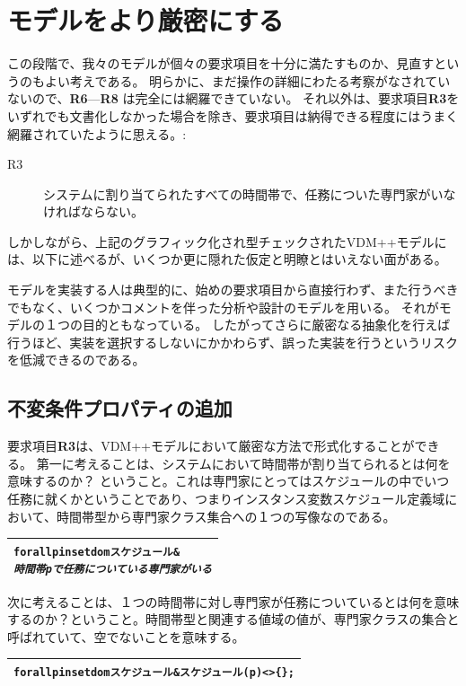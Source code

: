 \documentclass[\pformat,12pt,twoside]{jarticle}
\newenvironment{VDMgray}%
{\begin{tabular}{|G|}\hline\small\begin{alltt}}%
{\end{alltt}\normalsize\\
 \hline\end{tabular}}
\begin{document}
\section{モデルをより厳密にする}

この段階で、我々のモデルが個々の要求項目を十分に満たすものか、見直すというのもよい考えである。 
明らかに、まだ操作の詳細にわたる考察がなされていないので、\textbf{R6}---\textbf{R8} は完全には網羅できていない。
それ以外は、要求項目\textbf{R3}をいずれでも文書化しなかった場合を除き、要求項目は納得できる程度にはうまく網羅されていたように思える。:

\begin{description}
\item[R3] システムに割り当てられたすべての時間帯で、任務についた専門家がいなければならない。
\end{description}

しかしながら、上記のグラフィック化され型チェックされたVDM++モデルには、以下に述べるが、いくつか更に隠れた仮定と明瞭とはいえない面がある。

モデルを実装する人は典型的に、始めの要求項目から直接行わず、また行うべきでもなく、いくつかコメントを伴った分析や設計のモデルを用いる。
それがモデルの１つの目的ともなっている。
したがってさらに厳密なる抽象化を行えば行うほど、実装を選択するしないにかかわらず、誤った実装を行うというリスクを低減できるのである。

\subsection{不変条件プロパティの追加}

要求項目\textbf{R3}は、VDM++モデルにおいて厳密な方法で形式化することができる。
第一に考えることは、システムにおいて時間帯が割り当てられるとは何を意味するのか？
ということ。これは専門家にとってはスケジュールの中でいつ任務に就くかということであり、つまりインスタンス変数スケジュール定義域において、時間帯型から専門家クラス集合への１つの写像なのである。

\begin{VDMgray}
 forall p in set dom スケジュール \& 
   \textit{時間帯pで任務についている専門家がいる}
\end{VDMgray}

次に考えることは、１つの時間帯に対し専門家が任務についているとは何を意味するのか？ということ。時間帯型と関連する値域の値が、専門家クラスの集合と呼ばれていて、空でないことを意味する。

\begin{VDMgray}
 forall p in set dom スケジュール \& スケジュール(p) \texttt{<}\texttt{>} \{\};
\end{VDMgray}
\end{document}
